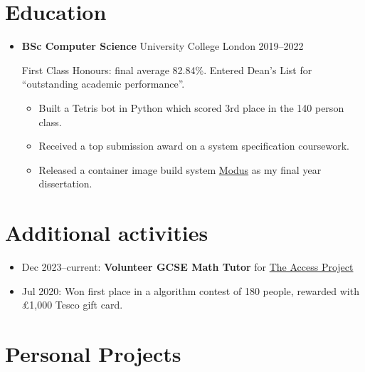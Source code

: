   \section{Education}

  \begin{itemize}
    \item \textbf{BSc Computer Science} \dashdiv{} University College London \dashdiv{} 2019--2022

      First Class Honours: final average 82.84\%. Entered Dean's List for ``outstanding academic performance''.

      \begin{itemize}
        \item Built a Tetris bot in Python which scored 3rd place in the 140 person class.
        \item Received a top submission award on a system specification coursework.

        \item Released a container image build system \href{https://modus-continens.com/}{\color{link}Modus} as my final year dissertation.
      \end{itemize}


  \end{itemize}

  \section{Additional activities}

  \begin{itemize}
    \item Dec 2023--current: \textbf{Volunteer GCSE Math Tutor} for \href{https://www.theaccessproject.org.uk}{\color{link}The Access Project}
    \item Jul 2020: Won first place in a algorithm contest of 180 people, rewarded with £1,000 Tesco gift card.
  \end{itemize}

  \section{Personal Projects}

